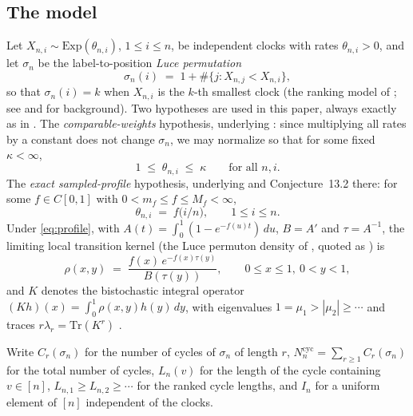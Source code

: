 \documentclass[11pt]{article}
\newcommand{\1}{\mathbf{1}}
\newcommand{\Tr}{\mathrm{Tr}}
\newcommand{\cyc}{\mathrm{cyc}}
\theoremstyle{remark}
\begin{document}
\subsection{The model}
Let $X_{n,i}\sim\mathrm{Exp}(\theta_{n,i})$, $1\le i\le n$, be
independent clocks with rates $\theta_{n,i}>0$, and let $\sigma_n$ be
the label-to-position \emph{Luce permutation}
\begin{equation*}
\sigma_n(i)\;=\;1+\#\{j:X_{n,j}<X_{n,i}\},
\end{equation*}
so that $\sigma_n(i)=k$ when $X_{n,i}$ is the $k$-th smallest clock
(the ranking model of \cite{Luc59}; see \cite[Section~2]{Lon26} and
\cite{CDK24,BCD25} for background). Two hypotheses are used in this
paper, always exactly as in \cite{Lon26}. The \emph{comparable-weights}
hypothesis, underlying \cite[Theorem~6.1]{Lon26}: since multiplying
all rates by a constant does not change $\sigma_n$, we may normalize
so that for some fixed $\kappa<\infty$,
\begin{equation}\label{eq:comparable}
1\;\le\;\theta_{n,i}\;\le\;\kappa\qquad\text{for all }n,i.
\end{equation}
The \emph{exact sampled-profile} hypothesis, underlying
\cite[Section~5]{Lon26} and Conjecture~13.2 there: for some
$f\in C[0,1]$ with $0<m_f\le f\le M_f<\infty$,
\begin{equation}\label{eq:profile}
\theta_{n,i}\;=\;f\bigl(i/n\bigr),\qquad 1\le i\le n.
\end{equation}
Under \eqref{eq:profile}, with $A(t)=\int_0^1(1-e^{-f(u)t})\,du$,
$B=A'$ and $\tau=A^{-1}$, the limiting local transition kernel (the
Luce permuton density of \cite[Proposition~2.2]{BCD25}, quoted as
\cite[Section~5]{Lon26}) is
\begin{equation}\label{eq:permuton}
\rho(x,y)\;=\;\frac{f(x)\,e^{-f(x)\tau(y)}}{B(\tau(y))},
\qquad 0\le x\le1,\ 0<y<1,
\end{equation}
and $K$ denotes the bistochastic integral operator
$(Kh)(x)=\int_0^1\rho(x,y)h(y)\,dy$, with eigenvalues
$1=\mu_1>|\mu_2|\ge\cdots$ and traces
$r\lambda_r=\Tr(K^r)$ \cite[Theorem~5.19]{Lon26}.

Write $C_r(\sigma_n)$ for the number of cycles of $\sigma_n$ of length
$r$, $N_n^{\cyc}=\sum_{r\ge1}C_r(\sigma_n)$ for the total number of
cycles, $L_n(v)$ for the length of the cycle containing $v\in[n]$,
$L_{n,1}\ge L_{n,2}\ge\cdots$ for the ranked cycle lengths, and $I_n$
for a uniform element of $[n]$ independent of the clocks.
\end{document}
